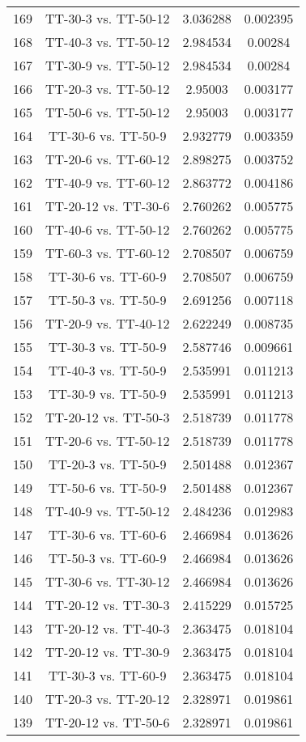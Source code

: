 \documentclass[a4paper,10pt]{article}
\begin{document}
\begin{landscape}
\begin{table}[!htp]
\begin{tabular}{cccc}
169&TT-30-3 vs. TT-50-12&3.036288&0.002395\\
168&TT-40-3 vs. TT-50-12&2.984534&0.00284\\
167&TT-30-9 vs. TT-50-12&2.984534&0.00284\\
166&TT-20-3 vs. TT-50-12&2.95003&0.003177\\
165&TT-50-6 vs. TT-50-12&2.95003&0.003177\\
164&TT-30-6 vs. TT-50-9&2.932779&0.003359\\
163&TT-20-6 vs. TT-60-12&2.898275&0.003752\\
162&TT-40-9 vs. TT-60-12&2.863772&0.004186\\
161&TT-20-12 vs. TT-30-6&2.760262&0.005775\\
160&TT-40-6 vs. TT-50-12&2.760262&0.005775\\
159&TT-60-3 vs. TT-60-12&2.708507&0.006759\\
158&TT-30-6 vs. TT-60-9&2.708507&0.006759\\
157&TT-50-3 vs. TT-50-9&2.691256&0.007118\\
156&TT-20-9 vs. TT-40-12&2.622249&0.008735\\
155&TT-30-3 vs. TT-50-9&2.587746&0.009661\\
154&TT-40-3 vs. TT-50-9&2.535991&0.011213\\
153&TT-30-9 vs. TT-50-9&2.535991&0.011213\\
152&TT-20-12 vs. TT-50-3&2.518739&0.011778\\
151&TT-20-6 vs. TT-50-12&2.518739&0.011778\\
150&TT-20-3 vs. TT-50-9&2.501488&0.012367\\
149&TT-50-6 vs. TT-50-9&2.501488&0.012367\\
148&TT-40-9 vs. TT-50-12&2.484236&0.012983\\
147&TT-30-6 vs. TT-60-6&2.466984&0.013626\\
146&TT-50-3 vs. TT-60-9&2.466984&0.013626\\
145&TT-30-6 vs. TT-30-12&2.466984&0.013626\\
144&TT-20-12 vs. TT-30-3&2.415229&0.015725\\
143&TT-20-12 vs. TT-40-3&2.363475&0.018104\\
142&TT-20-12 vs. TT-30-9&2.363475&0.018104\\
141&TT-30-3 vs. TT-60-9&2.363475&0.018104\\
140&TT-20-3 vs. TT-20-12&2.328971&0.019861\\
139&TT-20-12 vs. TT-50-6&2.328971&0.019861\\

\end{tabular}
\end{table}
\end{landscape}
\end{document}
